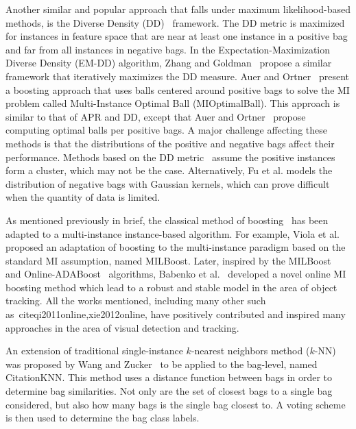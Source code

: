 \documentclass[reqno]{vcuthesis}
\numberwithin{equation}{chapter}
\begin{document}
Another similar and popular approach that falls under maximum likelihood-based methods, is the Diverse Density (DD)~\cite{Maron1998} framework. The DD metric is maximized for instances in feature space that are near at least one instance in a positive bag and far from all instances in negative bags. In the Expectation-Maximization Diverse Density (EM-DD) algorithm, Zhang and Goldman~\cite{Zhang2001} propose a similar framework that iteratively maximizes the DD measure. Auer and Ortner~\cite{Auer2004} present a boosting approach that uses balls centered around positive bags to solve the MI problem called Multi-Instance Optimal Ball (MIOptimalBall). This approach is similar to that of APR and DD, except that Auer and Ortner~\cite{Auer2004} propose computing optimal balls per positive bags. A major challenge affecting these methods is that the distributions of the positive and negative bags affect their performance. Methods based on the DD metric~\cite{Carbonneau2016,Chen2006,Chen2004} assume the positive instances form a cluster, which may not be the case. Alternatively, Fu et al.\cite{Fu2011} models the distribution of negative bags with Gaussian kernels, which can prove difficult when the quantity of data is limited.

As mentioned previously in brief, the classical method of boosting~\cite{freund1996experiments,schapire1999improved} has been adapted to a multi-instance instance-based algorithm. For example, Viola et al.~\cite{zhang2006multiple} proposed an adaptation of boosting to the multi-instance paradigm based on the standard MI assumption, named MILBoost. Later, inspired by the MILBoost~\cite{zhang2006multiple} and Online-ADABoost~\cite{oza2001online} algorithms, Babenko et al.~\cite{babenko2009visual} developed a novel online MI boosting method which lead to a robust and stable model in the area of object tracking. All the works mentioned, including many other such as~cite{qi2011online,xie2012online}, have positively contributed and inspired many approaches in the area of visual detection and tracking.

An extension of traditional single-instance $k$-nearest neighbors method ($k$-NN) was proposed by Wang and Zucker~\cite{Wang2000} to be applied to the bag-level, named CitationKNN. This method uses a distance function between bags in order to determine bag similarities. Not only are the set of closest bags to a single bag  considered, but also how many bags is the single bag closest to. A voting scheme is then used to determine the bag class labels.
\end{document}
